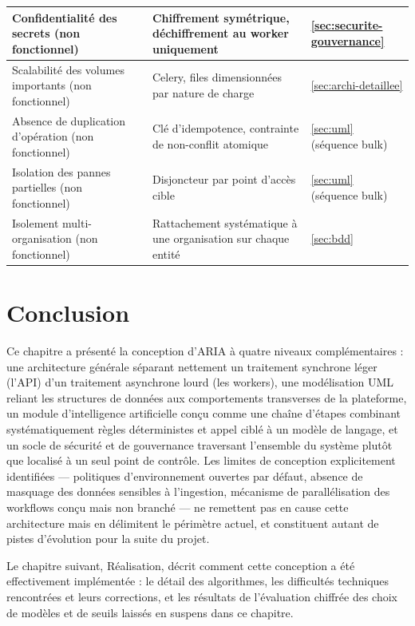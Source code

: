 \begin{longtable}{L{4cm}L{4.5cm}Y}
  Confidentialité des secrets (non fonctionnel) & Chiffrement symétrique, déchiffrement au worker uniquement & \ref{sec:securite-gouvernance} \\ \hline
  Scalabilité des volumes importants (non fonctionnel) & Celery, files dimensionnées par nature de charge & \ref{sec:archi-detaillee} \\ \hline
  Absence de duplication d'opération (non fonctionnel) & Clé d'idempotence, contrainte de non-conflit atomique & \ref{sec:uml} (séquence bulk) \\ \hline
  Isolation des pannes partielles (non fonctionnel) & Disjoncteur par point d'accès cible & \ref{sec:uml} (séquence bulk) \\ \hline
  Isolement multi-organisation (non fonctionnel) & Rattachement systématique à une organisation sur chaque entité & \ref{sec:bdd} \\ \hline
\end{longtable}

\section*{Conclusion}
{}

Ce chapitre a présenté la conception d'ARIA à quatre niveaux complémentaires : une architecture générale séparant nettement un traitement synchrone léger (l'API) d'un traitement asynchrone lourd (les workers), une modélisation UML reliant les structures de données aux comportements transverses de la plateforme, un module d'intelligence artificielle conçu comme une chaîne d'étapes combinant systématiquement règles déterministes et appel ciblé à un modèle de langage, et un socle de sécurité et de gouvernance traversant l'ensemble du système plutôt que localisé à un seul point de contrôle. Les limites de conception explicitement identifiées — politiques d'environnement ouvertes par défaut, absence de masquage des données sensibles à l'ingestion, mécanisme de parallélisation des workflows conçu mais non branché — ne remettent pas en cause cette architecture mais en délimitent le périmètre actuel, et constituent autant de pistes d'évolution pour la suite du projet.

Le chapitre suivant, Réalisation, décrit comment cette conception a été effectivement implémentée : le détail des algorithmes, les difficultés techniques rencontrées et leurs corrections, et les résultats de l'évaluation chiffrée des choix de modèles et de seuils laissés en suspens dans ce chapitre.
